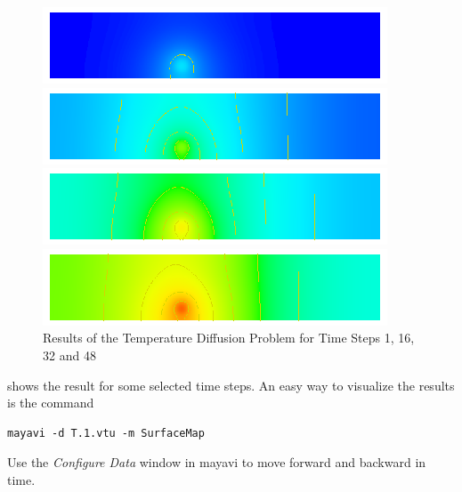 \begin{figure}
\centerline{\includegraphics[width=\figwidth]{DiffusionRes1}}
\centerline{\includegraphics[width=\figwidth]{DiffusionRes16}}
\centerline{\includegraphics[width=\figwidth]{DiffusionRes32}}
\centerline{\includegraphics[width=\figwidth]{DiffusionRes48}}
\caption{Results of the Temperature Diffusion Problem for Time Steps 1, 16, 32 and 48}
\label{DIFFUSION FIG 2}
\end{figure}
 shows the result for some selected time steps.
An easy way to visualize the results is the command
\begin{verbatim}
mayavi -d T.1.vtu -m SurfaceMap
\end{verbatim}
Use the \emph{Configure Data} window in mayavi to move forward and backward in time.

